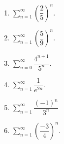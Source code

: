 \begin{enumerate}
\begin{enumerate}
\item $%
{\displaystyle\sum\limits_{n=1}^{\infty}}
\left(  \dfrac{2}{5}\right)  ^{n}.$

\item $%
{\displaystyle\sum\limits_{n=1}^{\infty}}
\left(  \dfrac{5}{9}\right)  ^{n}.$

\item $%
{\displaystyle\sum\limits_{n=0}^{\infty}}
\dfrac{4^{n+1}}{5^{n}}.$

\item $%
{\displaystyle\sum\limits_{n=1}^{\infty}}
\dfrac{1}{e^{2n}}.$

\item $%
{\displaystyle\sum\limits_{n=1}^{\infty}}
\dfrac{\left(  -1\right)  ^{n}}{3^{n}}$

\item $%
{\displaystyle\sum\limits_{n=1}^{\infty}}
\left(  \dfrac{-3}{4}\right)  ^{n}.$
\end{enumerate}
\end{enumerate}

\clearpage


